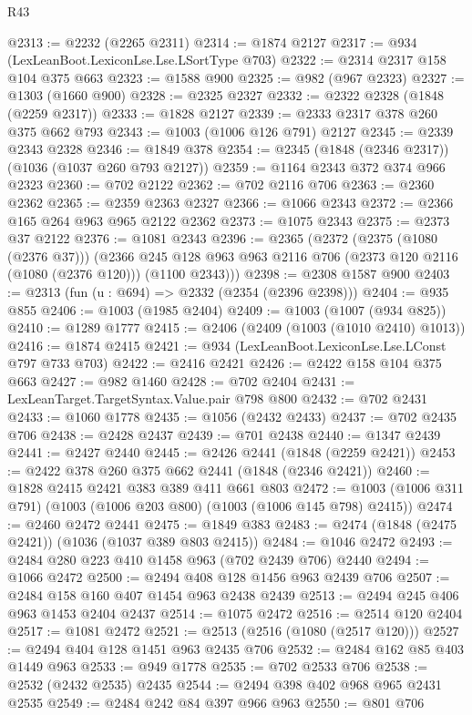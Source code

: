 \begin{lexlean}{R43}
\begin{coremodule}
@2313 := @2232 (@2265 @2311)
@2314 := @1874 @2127
@2317 := @934 (LexLeanBoot.LexiconLse.Lse.LSortType @703)
@2322 := @2314 @2317 @158 @104 @375 @663
@2323 := @1588 @900
@2325 := @982 (@967 @2323)
@2327 := @1303 (@1660 @900)
@2328 := @2325 @2327
@2332 := @2322 @2328 (@1848 (@2259 @2317))
@2333 := @1828 @2127
@2339 := @2333 @2317 @378 @260 @375 @662 @793
@2343 := @1003 (@1006 @126 @791) @2127
@2345 := @2339 @2343 @2328
@2346 := @1849 @378
@2354 := @2345 (@1848 (@2346 @2317)) (@1036 (@1037 @260 @793 @2127))
@2359 := @1164 @2343 @372 @374 @966 @2323
@2360 := @702 @2122
@2362 := @702 @2116 @706
@2363 := @2360 @2362
@2365 := @2359 @2363 @2327
@2366 := @1066 @2343
@2372 := @2366 @165 @264 @963 @965 @2122 @2362
@2373 := @1075 @2343
@2375 := @2373 @37 @2122
@2376 := @1081 @2343
@2396 := @2365
    (@2372
      (@2375 (@1080 (@2376 @37)))
      (@2366 @245 @128 @963 @963 @2116 @706 (@2373 @120 @2116 (@1080 (@2376 @120))) (@1100 @2343)))
@2398 := @2308 @1587 @900
@2403 := @2313 (fun (u : @694) => @2332 (@2354 (@2396 @2398)))
@2404 := @935 @855
@2406 := @1003 (@1985 @2404)
@2409 := @1003 (@1007 (@934 @825))
@2410 := @1289 @1777
@2415 := @2406 (@2409 (@1003 (@1010 @2410) @1013))
@2416 := @1874 @2415
@2421 := @934 (LexLeanBoot.LexiconLse.Lse.LConst @797 @733 @703)
@2422 := @2416 @2421
@2426 := @2422 @158 @104 @375 @663
@2427 := @982 @1460
@2428 := @702 @2404
@2431 := LexLeanTarget.TargetSyntax.Value.pair @798 @800
@2432 := @702 @2431
@2433 := @1060 @1778
@2435 := @1056 (@2432 @2433)
@2437 := @702 @2435 @706
@2438 := @2428 @2437
@2439 := @701 @2438
@2440 := @1347 @2439
@2441 := @2427 @2440
@2445 := @2426 @2441 (@1848 (@2259 @2421))
@2453 := @2422 @378 @260 @375 @662 @2441 (@1848 (@2346 @2421))
@2460 := @1828 @2415 @2421 @383 @389 @411 @661 @803
@2472 := @1003 (@1006 @311 @791) (@1003 (@1006 @203 @800) (@1003 (@1006 @145 @798) @2415))
@2474 := @2460 @2472 @2441
@2475 := @1849 @383
@2483 := @2474 (@1848 (@2475 @2421)) (@1036 (@1037 @389 @803 @2415))
@2484 := @1046 @2472
@2493 := @2484 @280 @223 @410 @1458 @963 (@702 @2439 @706) @2440
@2494 := @1066 @2472
@2500 := @2494 @408 @128 @1456 @963 @2439 @706
@2507 := @2484 @158 @160 @407 @1454 @963 @2438 @2439
@2513 := @2494 @245 @406 @963 @1453 @2404 @2437
@2514 := @1075 @2472
@2516 := @2514 @120 @2404
@2517 := @1081 @2472
@2521 := @2513 (@2516 (@1080 (@2517 @120)))
@2527 := @2494 @404 @128 @1451 @963 @2435 @706
@2532 := @2484 @162 @85 @403 @1449 @963
@2533 := @949 @1778
@2535 := @702 @2533 @706
@2538 := @2532 (@2432 @2535) @2435
@2544 := @2494 @398 @402 @968 @965 @2431 @2535
@2549 := @2484 @242 @84 @397 @966 @963
@2550 := @801 @706

\end{coremodule}
\end{lexlean}
